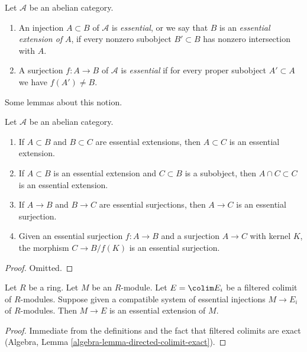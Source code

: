\begin{definition}
\label{definition-essential}
Let $\mathcal{A}$ be an abelian category.
\begin{enumerate}
\item An injection $A \subset B$ of $\mathcal{A}$ is {\it essential},
or we say that $B$ is an {\it essential extension of} $A$,
if every nonzero subobject $B' \subset B$ has nonzero intersection with $A$.
\item A surjection $f : A \to B$ of $\mathcal{A}$ is {\it essential}
if for every proper subobject $A' \subset A$ we have $f(A') \not = B$.
\end{enumerate}
\end{definition}

\noindent
Some lemmas about this notion.

\begin{lemma}
\label{lemma-essential}
Let $\mathcal{A}$ be an abelian category.
\begin{enumerate}
\item If $A \subset B$ and $B \subset C$ are essential extensions, then
$A \subset C$ is an essential extension.
\item If $A \subset B$ is an essential extension and $C \subset B$
is a subobject, then $A \cap C \subset C$ is an essential extension.
\item If $A \to B$ and $B \to C$ are essential surjections, then
$A \to C$ is an essential surjection.
\item Given an essential surjection $f : A \to B$ and a surjection
$A \to C$ with kernel $K$, the morphism $C \to B/f(K)$ is an essential
surjection.
\end{enumerate}
\end{lemma}

\begin{proof}
Omitted.
\end{proof}

\begin{lemma}
\label{lemma-union-essential-extensions}
Let $R$ be a ring. Let $M$ be an $R$-module. Let $E = \colim E_i$
be a filtered colimit of $R$-modules. Suppose given a compatible
system of essential injections $M \to E_i$ of $R$-modules.
Then $M \to E$ is an essential extension of $M$.
\end{lemma}

\begin{proof}
Immediate from the definitions and the fact that filtered
colimits are exact (Algebra, Lemma \ref{algebra-lemma-directed-colimit-exact}).
\end{proof}

